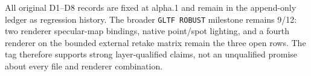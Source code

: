 All original D1--D8 records are fixed at alpha.1 and remain in the append-only ledger as
regression history. The broader \texttt{GLTF ROBUST} milestone remains 9/12: two renderer
specular-map bindings, native point/spot lighting, and a fourth renderer on the bounded external
retake matrix remain the three open rows. The tag therefore supports strong layer-qualified
claims, not an unqualified promise about every file and renderer combination.
